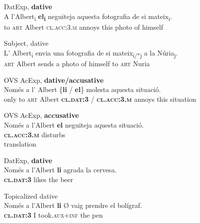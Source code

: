 \documentclass[output=paper,colorlinks,citecolor=brown,modfonts,nonflat]{langsci/langscibook}
\begin{document}
 \ex DatExp, \textbf{dative}\label{ex:royo:8b}\\
 \gll A l’Albert\textsubscript{i} \textbf{el\textsubscript{i}} neguiteja aquesta fotografia de si mateix\textsubscript{i}.\\
 to \textsc{art} Albert {\textsc{cl.acc:3.m}} annoys this photo of himself\\
\glt {}

 
  \ex Subject, dative\label{ex:royo:8d}\\
 \gll L’ Albert\textsubscript{i} envia una fotografia de si mateix\textsubscript{i/*j} a la Núria\textsubscript{j}.\\
 \textsc{art} Albert sends a photo of himself to \textsc{art} Nuria\\
\glt {}
 
 \z
 \z

\ea%
 \label{ex:royo:9}
 \ea OVS AcExp, \textbf{dative/accusative} \label{ex:royo:9a}\\
 \gll Només a l’ Albert \{\textbf{li} / \textbf{el}\} molesta aquesta situació. \\
 only to \textsc{art} Albert \textbf{\textsc{cl.dat:3}} / \textbf{\textsc{cl.acc:3.m}} annoys this situation \\
\glt {}
 
 \ex OVS AcExp, \textbf{accusative} \label{ex:royo:9b}\\
 \gll Només a l’Albert \textbf{el} neguiteja aquesta situació.\\
  \textbf{\textsc{cl.acc:3.m}} disturbs  \\
 \glt  translation
 
  \ex DatExp, \textbf{dative} \label{ex:royo:9c}\\
 \gll   Només a l’Albert \textbf{li} agrada la cervesa. \\
 \textbf{\textsc{cl.dat:3}} likes the beer    \\
\glt {}
 
 \ex Topicalized dative \label{ex:royo:9d}\\
\gll  Només a l’Albert \textbf{li} Ø vaig prendre el bolígraf.\footnotemark{}\\
\textbf{\textsc{cl.dat:3}} I took.\textsc{aux+inf} the pen     \\
\glt {}
 \z
 \z
 
\end{document}
